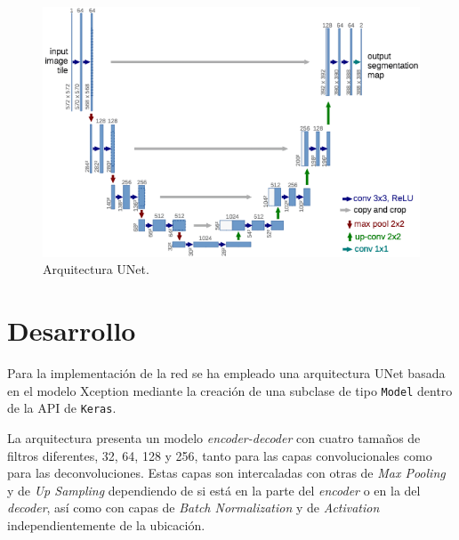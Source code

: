 \documentclass[a4paper]{article}
\newcommand\imgScale {0.6}
\begin{document}
\begin{figure}[hbtp]
    \centering
    \includegraphics[scale=\imgScale]{img/unet.png}
    \caption{\small Arquitectura UNet.}
    \label{fig:unet}
\end{figure}


\section{Desarrollo}
Para la implementación de la red se ha empleado una arquitectura UNet basada en el modelo Xception mediante la creaci\'on de una subclase de tipo \texttt{Model} dentro de la API de \texttt{Keras}.
\newline
    
La arquitectura presenta un modelo \textit{encoder-decoder} con cuatro tama\~nos de filtros diferentes, 32, 64, 128 y 256, tanto para las capas convolucionales como para las deconvoluciones. Estas capas son intercaladas con otras de \textit{Max Pooling} y de \textit{Up Sampling} dependiendo de si está en la parte del \textit{encoder} o en la del \textit{decoder}, así como con capas de \textit{Batch Normalization} y de \textit{Activation} independientemente de la ubicación.
\newline
\end{document}
